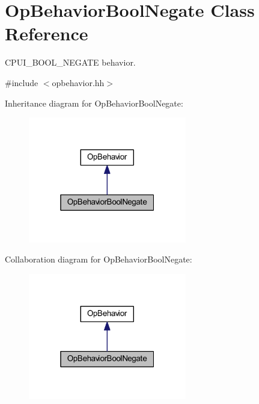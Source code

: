 \hypertarget{class_op_behavior_bool_negate}{}\section{Op\+Behavior\+Bool\+Negate Class Reference}
\label{class_op_behavior_bool_negate}


C\+P\+U\+I\+\_\+\+B\+O\+O\+L\+\_\+\+N\+E\+G\+A\+TE behavior.  




{\ttfamily \#include $<$opbehavior.\+hh$>$}



Inheritance diagram for Op\+Behavior\+Bool\+Negate\+:
\nopagebreak
\begin{figure}[H]
\begin{center}
\leavevmode
\includegraphics[width=196pt]{class_op_behavior_bool_negate__inherit__graph}
\end{center}
\end{figure}


Collaboration diagram for Op\+Behavior\+Bool\+Negate\+:
\nopagebreak
\begin{figure}[H]
\begin{center}
\leavevmode
\includegraphics[width=196pt]{class_op_behavior_bool_negate__coll__graph}
\end{center}
\end{figure}
